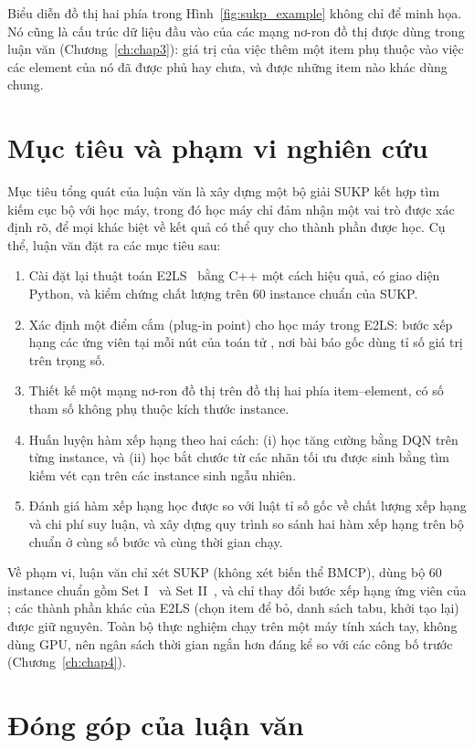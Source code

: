 Biểu diễn đồ thị hai phía trong Hình~\ref{fig:sukp_example} không chỉ để minh họa. Nó cũng là cấu trúc dữ liệu đầu vào của các mạng nơ-ron đồ thị được dùng trong luận văn (Chương~\ref{ch:chap3}): giá trị của việc thêm một item phụ thuộc vào việc các element của nó đã được phủ hay chưa, và được những item nào khác dùng chung.

\section{Mục tiêu và phạm vi nghiên cứu}

Mục tiêu tổng quát của luận văn là xây dựng một bộ giải SUKP kết hợp tìm kiếm cục bộ với học máy, trong đó học máy chỉ đảm nhận một vai trò được xác định rõ, để mọi khác biệt về kết quả có thể quy cho thành phần được học. Cụ thể, luận văn đặt ra các mục tiêu sau:
\begin{enumerate}
  \item Cài đặt lại thuật toán E2LS~\cite{Zhu2022} bằng C++ một cách hiệu quả, có giao diện Python, và kiểm chứng chất lượng trên 60 instance chuẩn của SUKP.
  \item Xác định một điểm cắm (plug-in point) cho học máy trong E2LS: bước xếp hạng các ứng viên tại mỗi nút của toán tử \addstar, nơi bài báo gốc dùng tỉ số giá trị trên trọng số.
  \item Thiết kế một mạng nơ-ron đồ thị trên đồ thị hai phía item--element, có số tham số không phụ thuộc kích thước instance.
  \item Huấn luyện hàm xếp hạng theo hai cách: (i) học tăng cường bằng DQN trên từng instance, và (ii) học bắt chước từ các nhãn tối ưu được sinh bằng tìm kiếm vét cạn trên các instance sinh ngẫu nhiên.
  \item Đánh giá hàm xếp hạng học được so với luật tỉ số gốc về chất lượng xếp hạng và chi phí suy luận, và xây dựng quy trình so sánh hai hàm xếp hạng trên bộ chuẩn ở cùng số bước và cùng thời gian chạy.
\end{enumerate}

Về phạm vi, luận văn chỉ xét SUKP (không xét biến thể BMCP), dùng bộ 60 instance chuẩn gồm Set I~\cite{He2018} và Set II~\cite{Wei2021}, và chỉ thay đổi bước xếp hạng ứng viên của \addstar; các thành phần khác của E2LS (chọn item để bỏ, danh sách tabu, khởi tạo lại) được giữ nguyên. Toàn bộ thực nghiệm chạy trên một máy tính xách tay, không dùng GPU, nên ngân sách thời gian ngắn hơn đáng kể so với các công bố trước (Chương~\ref{ch:chap4}).

\section{Đóng góp của luận văn}

